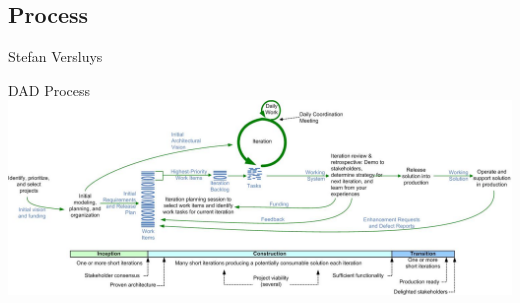 \begin{frame}
    \section{Process}

    Stefan Versluys

\end{frame}

\begin{frame}[label=process1]{DAD Process}
    \includegraphics[width = .9\textwidth]{dadLifecycleUP2}
\end{frame}

